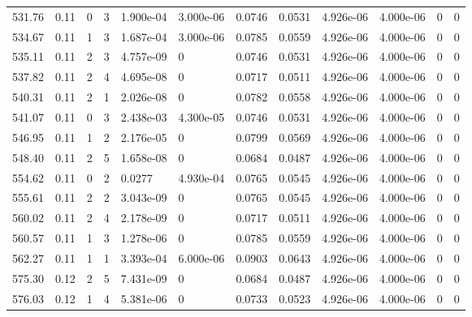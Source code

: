 \documentclass[preview]{standalone}
\begin{document}
{{{{{\begin{tabular}{L{1.2cm}C{1.2cm} C{0.3cm}C{0.5cm} C{1.4cm}C{1.4cm} C{1.4cm}C{1.4cm} C{1.6cm}C{1.6cm} C{1.6cm}C{1.6cm}}
  531.76  &  0.11  & 0     &  3 &  1.900e-04  & 3.000e-06  &  0.0746&   0.0531& 4.926e-06 & 4.000e-06   &  0 & 0  \\ 
  534.67  &  0.11  & 1     &  3 &  1.687e-04  & 3.000e-06  &  0.0785&   0.0559& 4.926e-06 & 4.000e-06   &  0 & 0  \\ 
  535.11  &  0.11  & 2     &  3 &  4.757e-09  & 0  &  0.0746&   0.0531& 4.926e-06 & 4.000e-06   &  0 & 0  \\ 
  537.82  &  0.11  & 2     &  4 &  4.695e-08  & 0  &  0.0717&   0.0511& 4.926e-06 & 4.000e-06   &  0 & 0  \\ 
  540.31  &  0.11  & 2     &  1 &  2.026e-08  & 0  &  0.0782&   0.0558& 4.926e-06 & 4.000e-06   &  0 & 0  \\ 
  541.07  &  0.11  & 0     &  3 &  2.438e-03  & 4.300e-05  &  0.0746&   0.0531& 4.926e-06 & 4.000e-06   &  0 & 0  \\ 
  546.95  &  0.11  & 1     &  2 &  2.176e-05  & 0  &  0.0799&   0.0569& 4.926e-06 & 4.000e-06   &  0 & 0  \\ 
  548.40  &  0.11  & 2     &  5 &  1.658e-08  & 0  &  0.0684&   0.0487& 4.926e-06 & 4.000e-06   &  0 & 0  \\ 
  554.62  &  0.11  & 0     &  2 &  0.0277  & 4.930e-04  &  0.0765&   0.0545& 4.926e-06 & 4.000e-06   &  0 & 0  \\ 
  555.61  &  0.11  & 2     &  2 &  3.043e-09  & 0  &  0.0765&   0.0545& 4.926e-06 & 4.000e-06   &  0 & 0  \\ 
  560.02  &  0.11  & 2     &  4 &  2.178e-09  & 0  &  0.0717&   0.0511& 4.926e-06 & 4.000e-06   &  0 & 0  \\ 
  560.57  &  0.11  & 1     &  3 &  1.278e-06  & 0  &  0.0785&   0.0559& 4.926e-06 & 4.000e-06   &  0 & 0  \\ 
  562.27  &  0.11  & 1     &  1 &  3.393e-04  & 6.000e-06  &  0.0903&   0.0643& 4.926e-06 & 4.000e-06   &  0 & 0  \\ 
  575.30  &  0.12  & 2     &  5 &  7.431e-09  & 0  &  0.0684&   0.0487& 4.926e-06 & 4.000e-06   &  0 & 0  \\ 
  576.03  &  0.12  & 1     &  4 &  5.381e-06  & 0  &  0.0733&   0.0523& 4.926e-06 & 4.000e-06   &  0 & 0  \\ 
\hline 
\end{tabular} 

}}}}}
\end{document}
